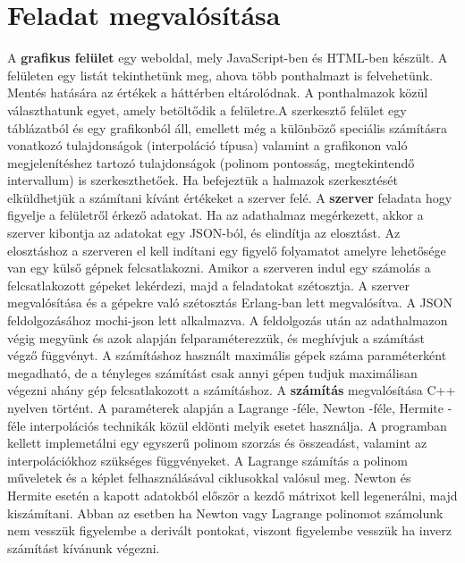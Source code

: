 \documentclass{elteikthesis}
\begin{document}
	\section{Feladat megvalósítása}
	A \textbf{grafikus felület}  egy weboldal, mely JavaScript-ben és HTML-ben készült.
	 A felületen egy listát tekinthetünk meg, ahova több ponthalmazt is felvehetünk. \newline  Mentés hatására az értékek a háttérben eltárolódnak. A ponthalmazok közül választhatunk egyet, amely betöltődik a felületre.\newline A szerkesztő felület egy táblázatból és egy grafikonból áll, emellett még a különböző speciális számításra vonatkozó tulajdonságok (interpoláció típusa) valamint a grafikonon való megjelenítéshez tartozó tulajdonságok (polinom pontosság, megtekintendő intervallum) is szerkeszthetőek. \newline Ha befejeztük a halmazok szerkesztését elküldhetjük a számítani kívánt értékeket a szerver felé.
	 \newline\newline
	A \textbf{szerver} feladata hogy figyelje a felületről érkező adatokat. Ha az adathalmaz megérkezett, akkor a szerver kibontja az adatokat egy JSON-ból, és elindítja az elosztást. \newline
	Az elosztáshoz a szerveren el kell indítani egy figyelő folyamatot amelyre lehetősége van egy külső gépnek felcsatlakozni. Amikor a szerveren indul egy számolás a felcsatlakozott gépeket lekérdezi, majd a feladatokat szétosztja.\newline
	A szerver megvalósítása és a gépekre való szétosztás Erlang-ban lett megvalósítva. A JSON feldolgozásához mochi-json lett alkalmazva. A feldolgozás után az adathalmazon végig megyünk és azok alapján felparaméterezzük, és meghívjuk a számítást végző függvényt.\newline
	A számításhoz használt maximális gépek száma paraméterként megadható, de a tényleges számítást csak annyi gépen tudjuk maximálisan végezni ahány gép felcsatlakozott a számításhoz.
	\newline\newline
	A \textbf{számítás} megvalósítása C++ nyelven történt. A paraméterek alapján a Lagrange -féle, Newton -féle, Hermite -féle interpolációs technikák közül eldönti melyik esetet használja.\newline
	A programban kellett implemetálni egy egyszerű polinom szorzás és összeadást, valamint az interpolációkhoz szükséges függvényeket. A Lagrange számítás a polinom műveletek és a képlet felhasználásával ciklusokkal valósul meg. Newton és Hermite esetén a kapott adatokból először a kezdő mátrixot kell legenerálni, majd kiszámítani. \newline
	Abban az esetben ha Newton vagy Lagrange polinomot számolunk nem vesszük figyelembe a derivált pontokat, viszont figyelembe vesszük ha inverz számítást kívánunk végezni. 
\end{document}
